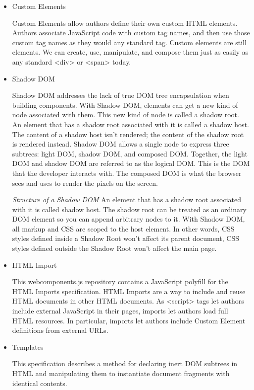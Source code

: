 \begin{itemize}

\item Custom Elements 

Custom Elements allow authors define their own custom HTML elements. Authors associate JavaScript code with custom tag names, and then use those custom tag names as they would any standard tag. Custom elements are still elements. We can create, use, manipulate, and compose them just as easily as any standard <div> or <span> today.

\item Shadow DOM

Shadow DOM addresses the lack of true DOM tree encapsulation when building components. With Shadow DOM, elements can get a new kind of node associated with them. This new kind of node is called a shadow root. An element that has a shadow root associated with it is called a shadow host. The content of a shadow host isn’t rendered; the content of the shadow root is rendered instead. Shadow DOM allows a single node to express three subtrees: light DOM, shadow DOM, and composed DOM. Together, the light DOM and shadow DOM are referred to as the logical DOM. This is the DOM that the developer interacts with. The composed DOM is what the browser sees and uses to render the pixels on the screen.

\emph{Structure of a Shadow DOM}
An element that has a shadow root associated with it is called shadow host. The shadow root can be treated as an ordinary DOM element so you can append arbitrary nodes to it. With Shadow DOM, all markup and CSS are scoped to the host element. In other words, CSS styles defined inside a Shadow Root won't affect its parent document, CSS styles defined outside the Shadow Root won't affect the main page.

\item HTML Import 

This webcomponents.js repository contains a JavaScript polyfill for the HTML Imports specification.
HTML Imports are a way to include and reuse HTML documents in other HTML documents. As <script> tags let authors include external JavaScript in their pages, imports let authors load full HTML resources. In particular, imports let authors include Custom Element definitions from external URLs.

\item Templates

This specification describes a method for declaring inert DOM subtrees in HTML and manipulating them to instantiate document fragments with identical contents.
\end{itemize}

